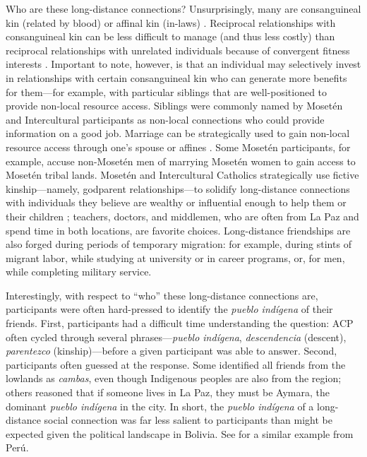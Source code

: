 \documentclass[bibauthoryear]{aa}
\begin{document}
	Who are these long-distance connections? Unsurprisingly, many are consanguineal kin (related by blood) or affinal kin (in-laws) \citep{pisorjones2020}. Reciprocal relationships with consanguineal kin can be less difficult to manage (and thus less costly) than reciprocal relationships with unrelated individuals because of convergent fitness interests \citep{hruschka2010}. Important to note, however, is that an individual may selectively invest in relationships with certain consanguineal kin who can generate more benefits for them---for example, with particular siblings that are well-positioned to provide non-local resource access. Siblings were commonly named by Moset\'en and Intercultural participants as non-local connections who could provide information on a good job. Marriage can be strategically used to gain non-local resource access through one's spouse or affines \citep{pisor2019evolution, chapais2009primeval}. Some Moset\'en participants, for example, accuse non-Moset\'en men of marrying Moset\'en women to gain access to Moset\'en tribal lands. Moset\'en and Intercultural Catholics strategically use fictive kinship---namely, godparent relationships---to solidify long-distance connections with individuals they believe are wealthy or influential enough to help them or their children \citep{mintz1950analysis}; teachers, doctors, and middlemen, who are often from La Paz and spend time in both locations, are favorite choices. Long-distance friendships are also forged during periods of temporary migration: for example, during stints of migrant labor, while studying at university or in career programs, or, for men, while completing  military service.
	
	Interestingly, with respect to ``who'' these long-distance connections are, participants were often hard-pressed to identify the \textit{pueblo ind\'igena} of their friends. First, participants had a difficult time understanding the question: ACP often cycled through several phrases---\textit{pueblo ind\'igena}, \textit{descendencia} (descent), \textit{parentezco} (kinship)---before a given participant was able to answer. Second, participants often guessed at the response. Some identified all friends from the lowlands as \textit{cambas}, even though Indigenous peoples are also from the region; others reasoned that if someone lives in La Paz, they must be Aymara, the dominant \textit{pueblo ind\'igena} in the city. In short, the \textit{pueblo ind\'igena} of a long-distance social connection was far less salient to participants than might be expected given the political landscape in Bolivia. See \citet{moya2015different} for a similar example from Per\'u.
\end{document}
